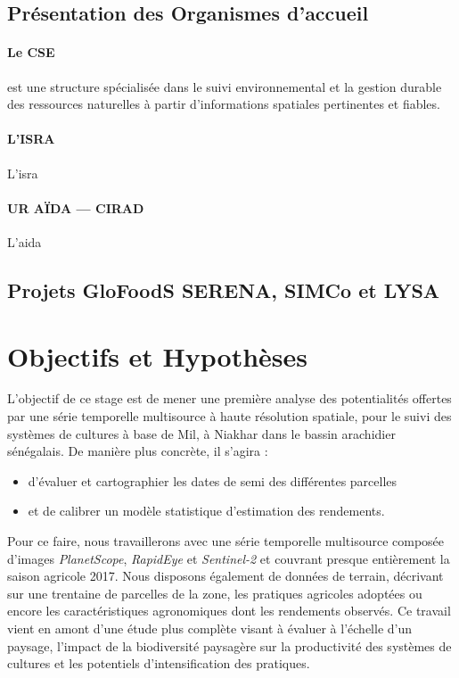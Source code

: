   \subsection{Présentation des Organismes d'accueil}
    \paragraph{Le CSE}
    est une structure spécialisée dans le suivi environnemental et la gestion durable des ressources naturelles à partir 
    d’informations spatiales pertinentes et fiables.
    
    \paragraph{L'ISRA}
    
    L'\acrlong{isra}
    
    \paragraph{UR AÏDA --- CIRAD}
    
    L'\acrlong{aida}
  
  \subsection{Projets GloFoodS SERENA, SIMCo et LYSA}

\section{Objectifs et Hypothèses}

L'objectif de ce stage est de mener une première analyse des potentialités offertes par une série temporelle multisource à haute résolution spatiale, pour le suivi des systèmes 
de cultures à base de Mil, à Niakhar dans le bassin arachidier sénégalais. De manière plus concrète, il s'agira :
  \begin{itemize}
   \item d'évaluer et cartographier les dates de semi des différentes parcelles
   \item et de calibrer un modèle statistique d'estimation des rendements.
  \end{itemize}
  
Pour ce faire, nous travaillerons avec une série temporelle multisource composée d'images \emph{PlanetScope}, \emph{RapidEye} et \emph{Sentinel-2} et couvrant presque entièrement 
la saison agricole 2017. Nous disposons également de données de terrain, décrivant sur une trentaine de parcelles de la zone, les pratiques agricoles adoptées ou encore les 
caractéristiques agronomiques dont les rendements observés. Ce travail vient en amont d'une étude plus complète visant à évaluer à l’échelle d’un paysage, l’impact de la 
biodiversité paysagère sur la productivité des systèmes de cultures et les potentiels d’intensification des pratiques.

